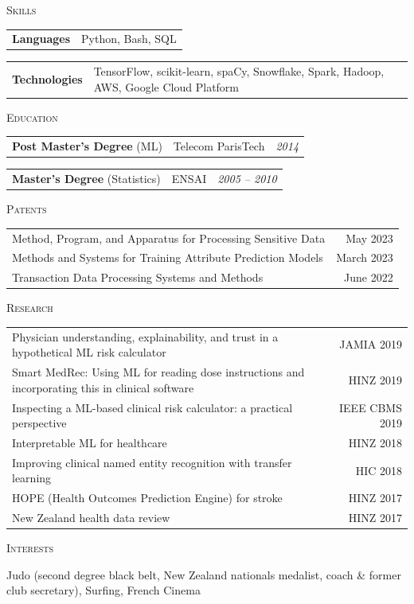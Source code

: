 \documentclass[letterpaper,11pt]{article}
\renewcommand{\section}[1]{
  {\scshape\color{blue}#1}{\color{blue}\hrulefill}{\vspace{0.2cm}}
}
\newcommand{\degree}[4]{
    \begin{tabular}{p{7cm}p{6cm}p{5cm}}
      \hspace{-0.7em} \textbf{\small{#1}} (\small{#2}) & \small{#3} & \hfill \textit{\small{#4}}
    \end{tabular}
}
\newcommand{\skillGroup}[2]{
    \begin{tabular}{p{7cm}p{11cm}}
      \hspace{-0.7em} \textbf{\small{#1}} & \small{#2}
    \end{tabular}
}
\begin{document}
\section{Skills}
\skillGroup {Languages}{Python, Bash, SQL}
\skillGroup {Technologies}{TensorFlow, scikit-learn, spaCy, Snowflake, Spark, Hadoop, AWS, Google Cloud Platform}
      
\section{\color{blue}Education}
  \degree {Post Master’s Degree}{ML}{Telecom ParisTech}{2014}
  \degree {Master's Degree}{Statistics}{ENSAI}{2005 -- 2010}

\section{Patents}
\begin{tabular*}{\textwidth}{l@{\extracolsep{\fill}}r}
{\small Method, Program, and Apparatus for Processing Sensitive Data} & {\small May 2023}\\
{\small Methods and Systems for Training Attribute Prediction Models} & {\small March 2023}\\
{\small Transaction Data Processing Systems and Methods} & {\small June 2022}\\
\end{tabular*}

\section{Research} 
\begin{tabular*}{\textwidth}{l@{\extracolsep{\fill}}r}
{\small Physician understanding, explainability, and trust in a hypothetical ML risk calculator} & {\small JAMIA 2019}\\
{\small Smart MedRec: Using ML for reading dose instructions and incorporating this in clinical software} & {\small HINZ 2019}\\
{\small Inspecting a ML-based clinical risk calculator: a practical perspective} & {\small IEEE CBMS 2019}\\
{\small Interpretable ML for healthcare} & {\small HINZ 2018}\\
{\small Improving clinical named entity recognition with transfer learning} & {\small HIC 2018}\\
{\small HOPE (Health Outcomes Prediction Engine) for stroke} & {\small HINZ 2017}\\
{\small New Zealand health data review} & {\small HINZ 2017}\\
\end{tabular*}

\section{Interests}
{\small Judo (second degree black belt, New Zealand nationals medalist, coach \& former club secretary)}, {\small Surfing}, {\small French Cinema}
\end{document}
